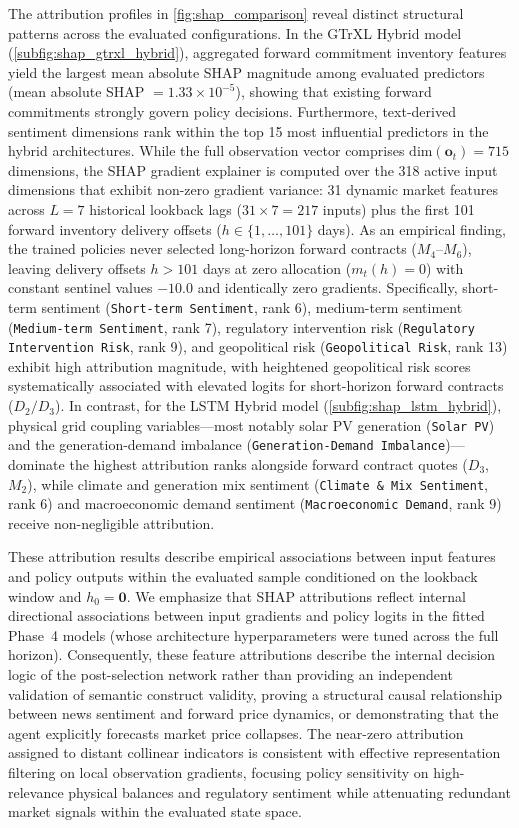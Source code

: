 The attribution profiles in \cref{fig:shap_comparison} reveal distinct structural patterns across the evaluated configurations. In the GTrXL Hybrid model (\cref{subfig:shap_gtrxl_hybrid}), aggregated forward commitment inventory features yield the largest mean absolute SHAP magnitude among evaluated predictors (mean absolute SHAP $= 1.33 \times 10^{-5}$), showing that existing forward commitments strongly govern policy decisions. Furthermore, text-derived sentiment dimensions rank within the top 15 most influential predictors in the hybrid architectures. While the full observation vector comprises $\text{dim}(\mathbf{o}_t) = 715$ dimensions, the SHAP gradient explainer is computed over the 318 active input dimensions that exhibit non-zero gradient variance: 31 dynamic market features across $L=7$ historical lookback lags ($31 \times 7 = 217$ inputs) plus the first 101 forward inventory delivery offsets ($h \in \{1, \dots, 101\}$ days). As an empirical finding, the trained policies never selected long-horizon forward contracts ($M_4$--$M_6$), leaving delivery offsets $h > 101$ days at zero allocation ($m_t(h)=0$) with constant sentinel values $-10.0$ and identically zero gradients. Specifically, short-term sentiment (\texttt{Short-term Sentiment}, rank 6), medium-term sentiment (\texttt{Medium-term Sentiment}, rank 7), regulatory intervention risk (\texttt{Regulatory Intervention Risk}, rank 9), and geopolitical risk (\texttt{Geopolitical Risk}, rank 13) exhibit high attribution magnitude, with heightened geopolitical risk scores systematically associated with elevated logits for short-horizon forward contracts ($D_2/D_3$). In contrast, for the LSTM Hybrid model (\cref{subfig:shap_lstm_hybrid}), physical grid coupling variables---most notably solar PV generation (\texttt{Solar PV}) and the generation-demand imbalance (\texttt{Generation-Demand Imbalance})---dominate the highest attribution ranks alongside forward contract quotes ($D_3$, $M_2$), while climate and generation mix sentiment (\texttt{Climate \& Mix Sentiment}, rank 6) and macroeconomic demand sentiment (\texttt{Macroeconomic Demand}, rank 9) receive non-negligible attribution.

These attribution results describe empirical associations between input features and policy outputs within the evaluated sample conditioned on the lookback window and $h_0 = \mathbf{0}$. We emphasize that SHAP attributions reflect internal directional associations between input gradients and policy logits in the fitted Phase~4 models (whose architecture hyperparameters were tuned across the full horizon). Consequently, these feature attributions describe the internal decision logic of the post-selection network rather than providing an independent validation of semantic construct validity, proving a structural causal relationship between news sentiment and forward price dynamics, or demonstrating that the agent explicitly forecasts market price collapses. The near-zero attribution assigned to distant collinear indicators is consistent with effective representation filtering on local observation gradients, focusing policy sensitivity on high-relevance physical balances and regulatory sentiment while attenuating redundant market signals within the evaluated state space.
